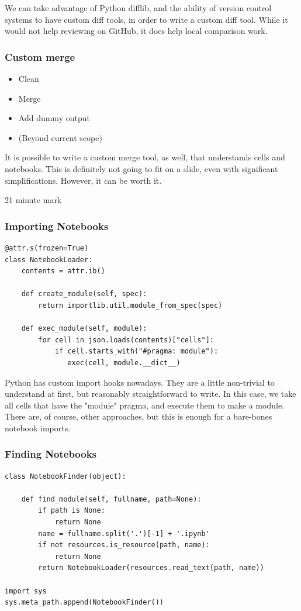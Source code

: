 We can take advantage of Python difflib,
and the ability of version control systems to
have custom diff tools,
in order to write a custom diff tool.
While it would not help reviewing on GitHub,
it does help local comparison work.

\begin{frame}
\frametitle{Custom merge}

\begin{itemize}
\item Clean
\item Merge
\item Add dummy output
\item (Beyond current scope)
\end{itemize}

\end{frame}

It is possible to write a custom merge tool,
as well,
that understands cells and notebooks.
This is definitely not going to fit on a slide,
even with significant simplifications.
However,
it can be worth it.

21 minute mark

\begin{frame}[fragile]
\frametitle{Importing Notebooks}

\begin{lstlisting}
@attr.s(frozen=True)
class NotebookLoader:
    contents = attr.ib()

    def create_module(self, spec):
        return importlib.util.module_from_spec(spec)

    def exec_module(self, module):
        for cell in json.loads(contents)["cells"]:
            if cell.starts_with("#pragma: module"):
               exec(cell, module.__dict__)
\end{lstlisting}

\end{frame}

Python has custom import hooks nowadays.
They are a little non-trivial to understand at first,
but reasonably straightforward to write.
In this case,
we take all cells that have the "module" pragma,
and execute them to make a module.
There are,
of course,
other approaches,
but this is enough for a bare-bones notebook imports.


\begin{frame}[fragile]
\frametitle{Finding Notebooks}

\begin{lstlisting}
class NotebookFinder(object):
 
    def find_module(self, fullname, path=None):
        if path is None:
            return None
        name = fullname.split('.')[-1] + '.ipynb'
        if not resources.is_resource(path, name):
            return None
        return NotebookLoader(resources.read_text(path, name))

import sys
sys.meta_path.append(NotebookFinder())
\end{lstlisting}

\end{frame}

